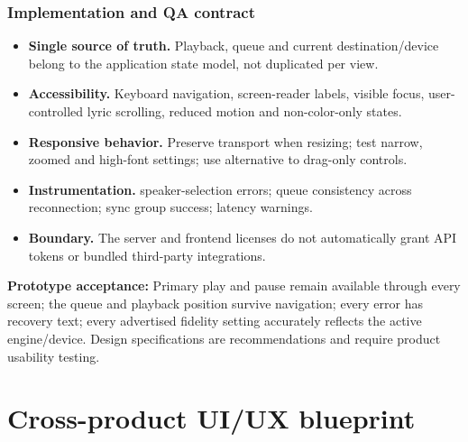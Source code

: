 \documentclass[10pt,a4paper,oneside]{report}
\begin{document}
\subsection*{Implementation and QA contract}
\begin{itemize}[leftmargin=*,itemsep=2pt,topsep=2pt]
\item \textbf{Single source of truth.} Playback, queue and current destination/device belong to the application state model, not duplicated per view.
\item \textbf{Accessibility.} Keyboard navigation, screen-reader labels, visible focus, user-controlled lyric scrolling, reduced motion and non-color-only states.
\item \textbf{Responsive behavior.} Preserve transport when resizing; test narrow, zoomed and high-font settings; use alternative to drag-only controls.
\item \textbf{Instrumentation.} speaker-selection errors; queue consistency across reconnection; sync group success; latency warnings.
\item \textbf{Boundary.} The server and frontend licenses do not automatically grant API tokens or bundled third-party integrations.
\end{itemize}
\vspace{2mm}\begin{evidencebox}\small\textbf{Prototype acceptance:} Primary play and pause remain available through every screen; the queue and playback position survive navigation; every error has recovery text; every advertised fidelity setting accurately reflects the active engine/device. Design specifications are recommendations and require product usability testing.\end{evidencebox}
\clearpage


\chapter*{Cross-product UI/UX blueprint}
\end{document}
